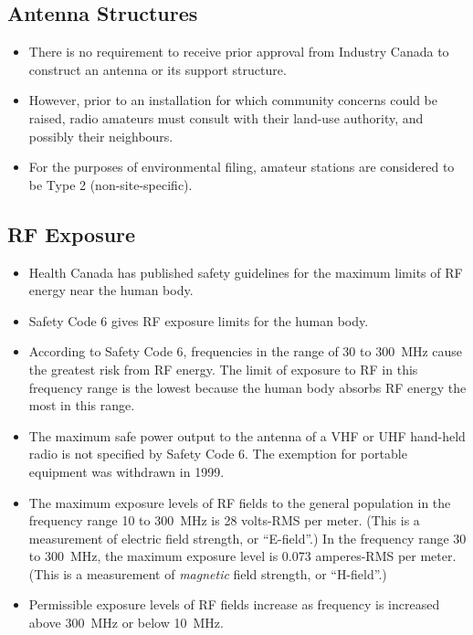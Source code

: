 \documentclass[letterpaper,12pt]{scrartcl}
\begin{document}
\subsection{Antenna Structures}

\begin{itemize}
\item There is no requirement to receive prior approval from Industry Canada to construct an antenna or its support structure.
\item However, prior to an installation for which community concerns could be raised, radio amateurs must consult with their land-use authority, and possibly their neighbours.
\item For the purposes of environmental filing, amateur stations are considered to be Type 2 (non-site-specific).
\end{itemize}

\subsection{RF Exposure}

\begin{itemize}
\item Health Canada has published safety guidelines for the maximum limits of RF energy near the human body.
\item Safety Code 6 gives RF exposure limits for the human body.
\item According to Safety Code 6, frequencies in the range of 30 to 300~MHz cause the greatest risk from RF energy.
The limit of exposure to RF in this frequency range is the lowest because the human body absorbs RF energy the most in this range.
\item The maximum safe power output to the antenna of a VHF or UHF hand-held radio is not specified by Safety Code 6. The exemption
for portable equipment was withdrawn in 1999.
\item The maximum exposure levels of RF fields to the general population in the frequency range 10 to 300~MHz is 28 volts-RMS per meter.
(This is a measurement of electric field strength, or ``E-field''.) In the frequency range 30 to 300~MHz,
the maximum exposure level is 0.073 amperes-RMS per meter. (This is a measurement of \textit{magnetic} field strength, or ``H-field''.)
\item Permissible exposure levels of RF fields increase as frequency is increased above 300~MHz or below 10~MHz.
\end{itemize}
\end{document}
